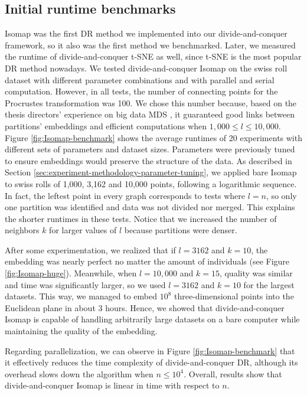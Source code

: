 \subsection{Initial runtime benchmarks}
\label{sec:initial-runtime-benchmarks}

Isomap was the first DR method we implemented into our divide-and-conquer framework, so it also was the first method we benchmarked. Later, we measured the runtime of divide-and-conquer t-SNE as well, since t-SNE is the most popular DR method nowadays. We tested divide-and-conquer Isomap on the swiss roll dataset with different parameter combinations and with parallel and serial computation. However, in all tests, the number of connecting points for the Procrustes transformation was 100. We chose this number because, based on the thesis directors' experience on big data MDS \citep{Delicado2024}, it guaranteed good links between partitions' embeddings and efficient computations when $1,000 \leq l \leq 10,000$. Figure \ref{fig:Isomap-benchmark} shows the average runtimes of 20 experiments with different sets of parameters and dataset sizes. Parameters were previously tuned to ensure embeddings would preserve the structure of the data. As described in Section \ref{sec:experiment-methodology-parameter-tuning}, we applied bare Isomap to swiss rolls of 1,000, 3,162 and 10,000 points, following a logarithmic sequence. In fact, the leftest point in every graph corresponds to tests where $l=n$, so only one partition was identified and data was not divided nor merged. This explains the shorter runtimes in these tests. Notice that we increased the number of neighbors $k$ for larger values of $l$ because partitions were denser.

After some experimentation, we realized that if $l=3162$ and $k=10$, the embedding was nearly perfect no matter the amount of individuals (see Figure \ref{fig:Isomap-huge}). Meanwhile, when $l=10,000$ and $k=15$, quality was similar and time was significantly larger, so we used $l=3162$ and $k=10$ for the largest datasets. This way, we managed to embed $10^8$ three-dimensional points into the Euclidean plane in about 3 hours. Hence, we showed that divide-and-conquer Isomap is capable of handling arbitrarily large datasets on a bare computer while maintaining the quality of the embedding.

Regarding parallelization, we can observe in Figure \ref{fig:Isomap-benchmark} that it effectively reduces the time complexity of divide-and-conquer DR, although its overhead slows down the algorithm when $n \leq 10^4$. Overall, results show that divide-and-conquer Isomap is linear in time with respect to $n$.


